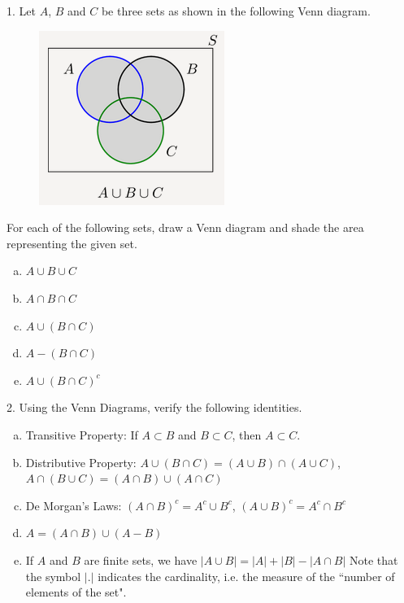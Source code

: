 \documentclass[12pt,thmsa]{article}\usepackage[]{graphicx}\usepackage[]{color}
\begin{document}
1. Let $ A $, $ B $ and $ C $ be three sets as shown in the following Venn diagram.\\
\begin{figure}[h!]
\begin{center}
\includegraphics[scale=1]{Capture.png}
\end{center}
\end{figure}
\newline
For each of the following sets, draw a Venn diagram and shade the area representing the given set.
\begin{enumerate}[a)]
\item $ A \cup B \cup C $
\item $ A \cap B \cap C $
\item $ A \cup (B \cap C) $
\item $ A - (B \cap C) $
\item $ A \cup (B \cap C)^{c} $
\end{enumerate}
\vspace{1cm}
2. Using the Venn Diagrams, verify the following identities.
\begin{enumerate}[a)]
\item Transitive Property: If $A \subset B$ and $B \subset C$, then $A \subset C$. \\
\item Distributive Property: $A \cup (B \cap C) = (A \cup B) \cap (A \cup C)$, $A \cap (B \cup C) = (A \cap B) \cup (A \cap C) $ \\
\item De Morgan's Laws: $(A \cap B)^c = A^c \cup B^c $, $(A \cup B)^c = A^c \cap B^c $\\
\item $ A=(A \cap B) \cup (A-B) $
\item If $ A $ and $ B $ are finite sets, we have $ |A \cup B|=|A|+|B|-|A \cap B| $
\subitem Note that the symbol $ | . | $ indicates the cardinality, i.e. the measure of the ``number of elements of the set".
\end{enumerate}
\end{document}
